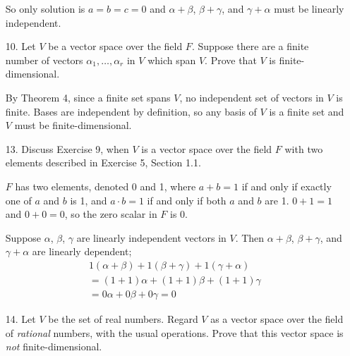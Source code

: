 \documentclass{article}
\begin{document}
\begin{enumerate}[listparindent=\parindent]
    So only solution is \(a = b = c = 0\) and \(\alpha + \beta\), \(\beta + \gamma\), and \(\gamma + \alpha\) must be linearly independent.

\item[10.] Let \(V\) be a vector space over the field \(F\). Suppose there are a finite number of vectors \(\alpha_1, \dots, \alpha_r\) in \(V\) which span \(V\).
    Prove that \(V\) is finite-dimensional.

    By Theorem 4, since a finite set spans \(V\), no independent set of vectors in \(V\) is finite.
    Bases are independent by definition, so any basis of \(V\) is a finite set and \(V\) must be finite-dimensional.

\item[13.] Discuss Exercise 9, when \(V\) is a vector space over the field \(F\) with two elements described in Exercise 5, Section 1.1.

    \(F\) has two elements, denoted 0 and 1, where \(a + b = 1\) if and only if exactly one of \(a\) and \(b\) is 1, and \(a \cdot b = 1\) if and only if both \(a\) and \(b\) are 1.
    \(0 + 1 = 1\) and \(0 + 0 = 0\), so the zero scalar in \(F\) is 0.

    Suppose \(\alpha\), \(\beta\), \(\gamma\) are linearly independent vectors in \(V\).
    Then \(\alpha + \beta\), \(\beta + \gamma\), and \(\gamma + \alpha\) are linearly dependent;
    \begin{gather*}
    1(\alpha + \beta) + 1(\beta + \gamma) + 1(\gamma + \alpha) \\
    = (1 + 1)\alpha + (1 + 1)\beta + (1 + 1)\gamma \\
    = 0\alpha + 0\beta + 0\gamma
    = 0
    \end{gather*}

\item[14.] Let \(V\) be the set of real numbers. Regard \(V\) as a vector space over the field of \textit{rational} numbers,
    with the usual operations. Prove that this vector space is \textit{not} finite-dimensional.

\end{enumerate}
\end{document}
